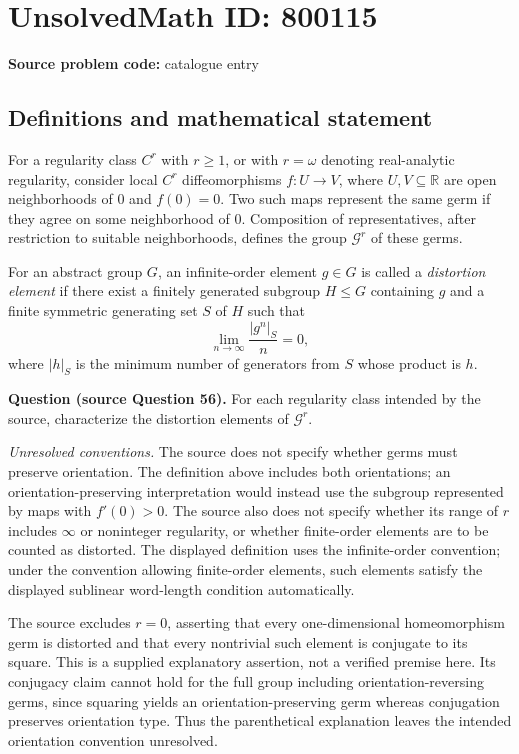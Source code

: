 \documentclass[11pt]{article}
\newcommand{\R}{\mathbb{R}}
\begin{document}
\section*{UnsolvedMath ID: 800115}
\textbf{Source problem code:} catalogue entry
\subsection{Definitions and mathematical statement}
For a regularity class \(C^r\) with \(r\geq 1\), or with \(r=\omega\) denoting real-analytic regularity, consider local \(C^r\) diffeomorphisms \(f:U\to V\), where \(U,V\subseteq\R\) are open neighborhoods of \(0\) and \(f(0)=0\). Two such maps represent the same germ if they agree on some neighborhood of \(0\). Composition of representatives, after restriction to suitable neighborhoods, defines the group \(\mathcal G^r\) of these germs.

For an abstract group \(G\), an infinite-order element \(g\in G\) is called a \emph{distortion element} if there exist a finitely generated subgroup \(H\leq G\) containing \(g\) and a finite symmetric generating set \(S\) of \(H\) such that
\[
\lim_{n\to\infty}\frac{|g^n|_S}{n}=0,
\]
where \(|h|_S\) is the minimum number of generators from \(S\) whose product is \(h\).

\textbf{Question (source Question 56).} For each regularity class intended by the source, characterize the distortion elements of \(\mathcal G^r\).

\textit{Unresolved conventions.} The source does not specify whether germs must preserve orientation. The definition above includes both orientations; an orientation-preserving interpretation would instead use the subgroup represented by maps with \(f'(0)>0\). The source also does not specify whether its range of \(r\) includes \(\infty\) or noninteger regularity, or whether finite-order elements are to be counted as distorted. The displayed definition uses the infinite-order convention; under the convention allowing finite-order elements, such elements satisfy the displayed sublinear word-length condition automatically.

The source excludes \(r=0\), asserting that every one-dimensional homeomorphism germ is distorted and that every nontrivial such element is conjugate to its square. This is a supplied explanatory assertion, not a verified premise here. Its conjugacy claim cannot hold for the full group including orientation-reversing germs, since squaring yields an orientation-preserving germ whereas conjugation preserves orientation type. Thus the parenthetical explanation leaves the intended orientation convention unresolved.
\end{document}
